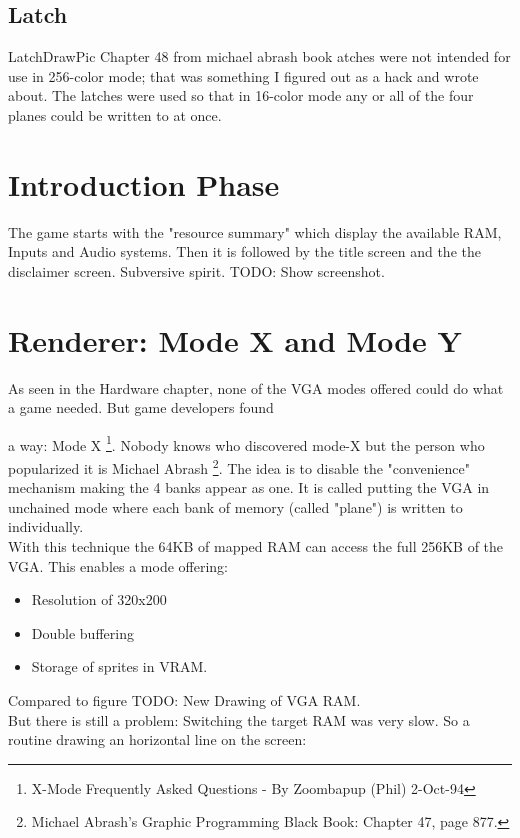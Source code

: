 \documentclass[book.tex]{subfiles}
\begin{document}
\subsection{Latch}
LatchDrawPic
Chapter 48 from michael abrash book
atches were not intended for use in 256-color mode; that was something I figured out as a hack and wrote about. The latches were used so that in 16-color mode any or all of the four planes could be written to at once.






\section{Introduction Phase}


The game starts with the "resource summary" which display the available RAM, Inputs and Audio systems. Then it is followed by the title screen and the the disclaimer screen. Subversive spirit.
TODO: Show screenshot.

\section{Renderer: Mode X and Mode Y}
As seen in the Hardware chapter, none of the VGA modes offered could do what a game needed. But game developers found

a way: Mode X \footnote{X-Mode Frequently Asked Questions - By Zoombapup (Phil)  2-Oct-94}. Nobody knows who discovered mode-X but the person who popularized it is Michael Abrash \footnote{Michael Abrash's Graphic Programming Black Book: Chapter 47, page 877.}. The idea is to disable the "convenience" mechanism making the 4 banks appear as one. It is called putting the VGA in unchained mode where each bank of memory (called "plane") is written to individually.\\
With this technique the 64KB of mapped RAM can access the full 256KB of the VGA. This enables a mode offering:
\begin{itemize}
	\item Resolution of 320x200
	\item Double buffering
	\item Storage of sprites in VRAM.
\end{itemize}

Compared to figure 
TODO: New Drawing of VGA RAM.\\
But there is still a problem: Switching the target RAM was very slow. So a routine drawing an horizontal line on the screen:
\end{document}
